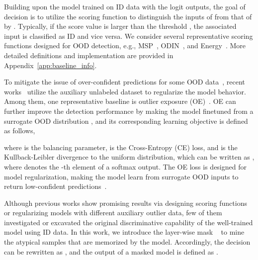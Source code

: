 \documentclass{article}
\theoremstyle{plain}
\theoremstyle{definition}
\theoremstyle{remark}
\begin{document}
Building upon the model  trained on ID data with the logit outputs, the goal of decision is to utilize the scoring function  to distinguish the inputs of  from that of  by . Typically, if the score value is larger than the threshold , the associated input  is classified as ID and vice versa. We consider several representative scoring functions designed for OOD detection, e.g., MSP~\citep{hendrycks17baseline}, ODIN~\citep{LiangLS18}, and Energy~\citep{liu2020energy}. More detailed definitions and implementation are provided in Appendix~\ref{app:baseline_info}.



To mitigate the issue of over-confident predictions for some OOD data~\citep{hendrycks17baseline,liu2020energy},  recent works~\citep{hendrycks2018deep, Tack20CSI} utilize the auxiliary unlabeled dataset to regularize the model behavior. Among them, one representative baseline is outlier exposure (OE)~\citep{hendrycks2018deep}. OE can further improve the detection performance by making the model  finetuned from a surrogate OOD distribution , and its corresponding learning objective is defined as follows,

where  is the balancing parameter,   is the Cross-Entropy (CE) loss, and  is the Kullback-Leibler divergence to the uniform distribution, which can be written as , where  denotes the -th element of a softmax output. The OE loss  is designed for model regularization, making the model learn from surrogate OOD inputs to return low-confident predictions~\citep{hendrycks2018deep}. 


Although previous works show promising results via designing scoring functions or regularizing models with different auxiliary outlier data, few of them investigated or excavated the original discriminative capability of the well-trained model using ID data. In this work, we introduce the layer-wise mask ~\citep{han2015deep,ramanujan2020s} to mine the atypical samples that are memorized by the model. Accordingly, the decision can be rewritten as , and the output of a masked model is defined as . 
\end{document}
